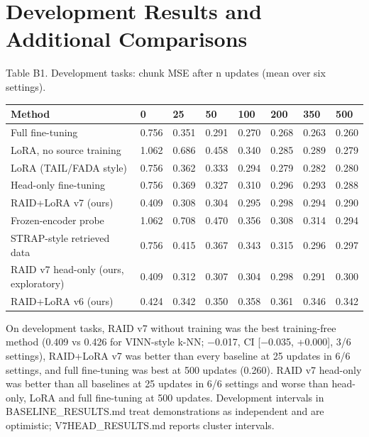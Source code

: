 \documentclass[11pt,a4paper]{article}
\begin{document}
\section{Development Results and Additional Comparisons}


Table B1. Development tasks: chunk MSE after n updates (mean over six settings).

{\def\LTcaptype{none} %
{\small
\begin{longtable}[]{@{}llllllll@{}}
\toprule\noalign{}
Method & 0 & 25 & 50 & 100 & 200 & 350 & 500 \\
\midrule\noalign{}
\endhead
\bottomrule\noalign{}
\endlastfoot
Full fine-tuning & 0.756 & 0.351 & 0.291 & 0.270 & 0.268 & 0.263 & 0.260 \\
LoRA, no source training & 1.062 & 0.686 & 0.458 & 0.340 & 0.285 & 0.289 & 0.279 \\
LoRA (TAIL/FADA style) & 0.756 & 0.362 & 0.333 & 0.294 & 0.279 & 0.282 & 0.280 \\
Head-only fine-tuning & 0.756 & 0.369 & 0.327 & 0.310 & 0.296 & 0.293 & 0.288 \\
RAID+LoRA v7 (ours) & 0.409 & 0.308 & 0.304 & 0.295 & 0.298 & 0.294 & 0.290 \\
Frozen-encoder probe & 1.062 & 0.708 & 0.470 & 0.356 & 0.308 & 0.314 & 0.294 \\
STRAP-style retrieved data & 0.756 & 0.415 & 0.367 & 0.343 & 0.315 & 0.296 & 0.297 \\
RAID v7 head-only (ours, exploratory) & 0.409 & 0.312 & 0.307 & 0.304 & 0.298 & 0.291 & 0.300 \\
RAID+LoRA v6 (ours) & 0.424 & 0.342 & 0.350 & 0.358 & 0.361 & 0.346 & 0.342 \\
\end{longtable}
}
}

On development tasks, RAID v7 without training was the best training-free method (0.409 vs 0.426 for VINN-style k-NN; \ensuremath{-}0.017, CI {[}\ensuremath{-}0.035, +0.000{]}, 3/6 settings), RAID+LoRA v7 was better than every baseline at 25 updates in 6/6 settings, and full fine-tuning was best at 500 updates (0.260). RAID v7 head-only was better than all baselines at 25 updates in 6/6 settings and worse than head-only, LoRA and full fine-tuning at 500 updates. Development intervals in BASELINE\_RESULTS.md treat demonstrations as independent and are optimistic; V7HEAD\_RESULTS.md reports cluster intervals.
\end{document}
